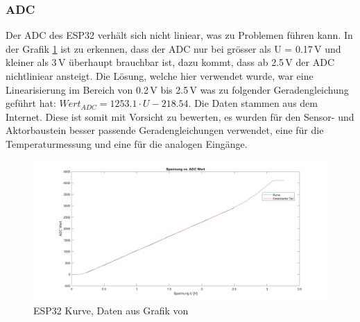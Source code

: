 \subsubsection{ADC}
Der ADC des ESP32 verhält sich nicht liniear, was zu Problemen führen kann. In der Grafik \ref{pic: ESP32_Kurve} ist zu erkennen, dass der ADC nur bei grösser als U = 0.17\,V und kleiner als 3\,V überhaupt brauchbar ist, dazu kommt, dass ab 2.5\,V der ADC nichtliniear ansteigt. Die Lösung, welche hier verwendet wurde, war eine Linearisierung im Bereich von  0.2\,V bis 2.5\,V was zu folgender Geradengleichung geführt hat: $Wert_{ADC} = 1253.1\cdot U - 218.54$. Die Daten stammen aus dem Internet. Diese ist somit mit Vorsicht zu bewerten, es wurden für den Sensor- und Aktorbaustein besser passende Geradengleichungen verwendet, eine für die Temperaturmessung und eine für die analogen Eingänge.
\begin{figure}[h!]
	\centering
	\includegraphics[width=\textwidth]{graphics/ESP32_Kurve.png}
	\caption{ESP32 Kurve, Daten aus Grafik von \cite{randomnerdtutorials_esp32_2019}}
	\label{pic: ESP32_Kurve}
\end{figure}

